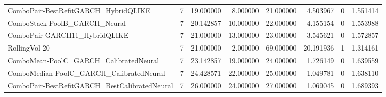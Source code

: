 \begin{tabular}{l r r r r r r r}
ComboPair-BestRefitGARCH\_HybridQLIKE & 7 & 19.000000 & 8.000000 & 21.000000 & 4.503967 & 0 & 1.551414 \\
ComboStack-PoolB\_GARCH\_Neural & 7 & 20.142857 & 10.000000 & 22.000000 & 4.155154 & 0 & 1.553988 \\
ComboPair-GARCH11\_HybridQLIKE & 7 & 21.000000 & 13.000000 & 23.000000 & 3.545621 & 0 & 1.572857 \\
RollingVol-20 & 7 & 21.000000 & 2.000000 & 69.000000 & 20.191936 & 1 & 1.314161 \\
ComboMean-PoolC\_GARCH\_CalibratedNeural & 7 & 23.142857 & 19.000000 & 24.000000 & 1.726149 & 0 & 1.639559 \\
ComboMedian-PoolC\_GARCH\_CalibratedNeural & 7 & 24.428571 & 22.000000 & 25.000000 & 1.049781 & 0 & 1.638110 \\
ComboPair-BestRefitGARCH\_BestCalibratedNeural & 7 & 26.000000 & 24.000000 & 27.000000 & 1.069045 & 0 & 1.689393 \\
\hline
\end{tabular}
